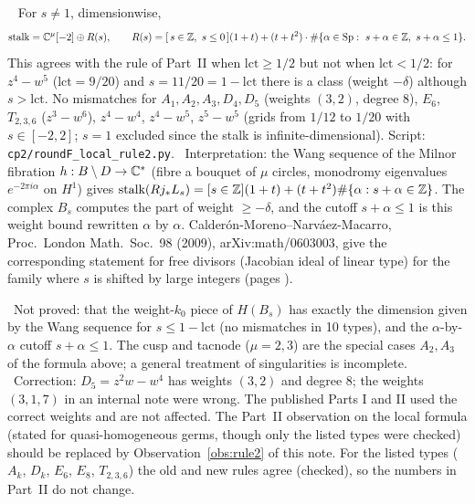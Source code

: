 \begin{obs}\tV\ \tC\label{obs:rule2}
For $s\ne1$, dimensionwise,
\[\text{stalk}=\C^\mu[-2]\oplus R(s),\qquad R(s)=[\,s\in\Z,\ s\le0\,](1+t)+(t+t^2)\cdot\#\{\alpha\in\mathrm{Sp}:\ s+\alpha\in\Z,\ s+\alpha\le1\}.\]
This agrees with the rule of Part~II when $\mathrm{lct}\ge1/2$ but not when $\mathrm{lct}<1/2$: for $z^4-w^5$ ($\mathrm{lct}=9/20$) and $s=11/20=1-\mathrm{lct}$ there is a class (weight $-\delta$) although $s>\mathrm{lct}$. No mismatches for $A_1,A_2,A_3,D_4,D_5$ (weights $(3,2)$, degree 8), $E_6$, $T_{2,3,6}$ ($z^3-w^6$), $z^4-w^4$, $z^4-w^5$, $z^5-w^5$ (grids from $1/12$ to $1/20$ with $s\in[-2,2]$; $s=1$ excluded since the stalk is infinite-dimensional). Script: \texttt{cp2/roundF\_local\_rule2.py}. \tC\ Interpretation: the Wang sequence of the Milnor fibration $h:B\setminus D\to\mathbb C^*$ (fibre a bouquet of $\mu$ circles, monodromy eigenvalues $e^{-2\pi i\alpha}$ on $H^1$) gives $\text{stalk}(Rj_*L_s)=[s\in\mathbb Z](1+t)+(t+t^2)\#\{\alpha:s+\alpha\in\mathbb Z\}$. The complex $B_s$ computes the part of weight $\ge-\delta$, and the cutoff $s+\alpha\le1$ is this weight bound rewritten $\alpha$ by $\alpha$. Calder\'on-Moreno--Narv\'aez-Macarro, Proc.\ London Math.\ Soc.\ 98 (2009), arXiv:math/0603003, give the corresponding statement for free divisors (Jacobian ideal of linear type) for the family where $s$ is shifted by large integers (pages \tQ).
\end{obs}
\noindent \tK\ Not proved: that the weight-$k_0$ piece of $H(B_s)$ has exactly the dimension given by the Wang sequence for $s\le1-\mathrm{lct}$ (no mismatches in 10 types), and the $\alpha$-by-$\alpha$ cutoff $s+\alpha\le1$. The cusp and tacnode ($\mu=2,3$) are the special cases $A_2,A_3$ of the formula above; a general treatment of singularities is incomplete.\\
\tP\ Correction: $D_5=z^2w-w^4$ has weights $(3,2)$ and degree 8; the weights $(3,1,7)$ in an internal note were wrong. The published Parts I and II used the correct weights and are not affected. The Part~II observation on the local formula (stated for quasi-homogeneous germs, though only the listed types were checked) should be replaced by Observation~\ref{obs:rule2} of this note. For the listed types ($A_k$, $D_k$, $E_6$, $E_8$, $T_{2,3,6}$) the old and new rules agree (checked), so the numbers in Part~II do not change.

